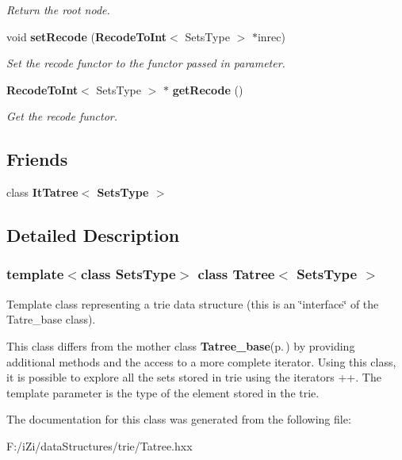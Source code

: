 \begin{CompactItemize}
\begin{CompactList}\small\item\em Return the root node. \item\end{CompactList}\item 
void {\bf set\-Recode} ({\bf Recode\-To\-Int}$<$ Sets\-Type $>$ $\ast$inrec)\label{class_tatree_69650ee7743c216a5e4080e2ebaa68a0}

\begin{CompactList}\small\item\em Set the recode functor to the functor passed in parameter. \item\end{CompactList}\item 
{\bf Recode\-To\-Int}$<$ Sets\-Type $>$ $\ast$ {\bf get\-Recode} ()\label{class_tatree_cca02ceb8838b29546f807316b187182}

\begin{CompactList}\small\item\em Get the recode functor. \item\end{CompactList}\end{CompactItemize}
\subsection*{Friends}
\begin{CompactItemize}
\item 
class {\bf It\-Tatree$<$ Sets\-Type $>$}\label{class_tatree_e63ac7816d95fec5ec77b16c2597e4b7}

\end{CompactItemize}


\subsection{Detailed Description}
\subsubsection*{template$<$class Sets\-Type$>$ class Tatree$<$ Sets\-Type $>$}

Template class representing a trie data structure (this is an \char`\"{}interface\char`\"{} of the Tatre\_\-base class). 

This class differs from the mother class {\bf Tatree\_\-base}{\rm (p.\,\pageref{class_tatree__base})} by providing additional methods and the access to a more complete iterator. Using this class, it is possible to explore all the sets stored in trie using the iterators ++. The template parameter is the type of the element stored in the trie. 



The documentation for this class was generated from the following file:\begin{CompactItemize}
\item 
F:/i\-Zi/data\-Structures/trie/Tatree.hxx\end{CompactItemize}
